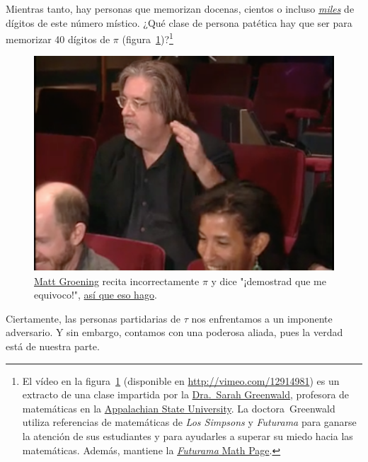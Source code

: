 Mientras tanto, hay personas que memorizan docenas, cientos o incluso  \href{https://www.guinnessworldrecords.com/world-records/most-pi-places-memorised}{\emph{miles}} de dígitos de este número místico. ¿Qué clase de persona patética hay que ser para memorizar 40 dígitos de $\pi$ (figura~\ref{fig:futurama_video})?\footnote{El vídeo en la figura~\ref{fig:futurama_video} (disponible en  \href{http://vimeo.com/12914981}{http://vimeo.com/12914981}) es un extracto de una clase impartida por la \href{https://cs.appstate.edu/~sjg/}{Dra.\ Sarah Greenwald}, profesora de matemáticas en la \href{http://www.appstate.edu/}{Appalachian State University}. La doctora\ Greenwald utiliza referencias de matemáticas de \emph{Los Simpsons} y \emph{Futurama} para ganarse la atención de sus estudiantes y para ayudarles a superar su miedo hacia las matemáticas. Además, mantiene la \href{http://mathsci2.appstate.edu/~sjg/futurama/}{\emph{Futurama} Math Page}.}

\begin{figure}
\begin{center}
\includegraphics{images/figures/futurama_math_lecture.png} %
\end{center}
\caption{\href{https://es.wikipedia.org/wiki/Matt_Groening}{Matt Groening} recita incorrectamente $\pi$ y dice "¡demostrad que me equivoco!", \href{https://vimeo.com/12914981}{así que eso hago}.\label{fig:futurama_video}}
\end{figure}

Ciertamente, las personas partidarias de $\tau$ nos enfrentamos a un imponente adversario. Y sin embargo, contamos con una poderosa aliada, pues la verdad está de nuestra parte.

